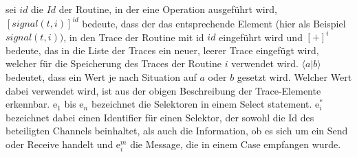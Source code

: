 sei $id$ die $Id$ der Routine, in der eine Operation ausgeführt wird,
$[signal(t, i)]^{id}$ bedeute, dass der das entsprechende Element (hier als 
Beispiel $signal(t, i))$, in den Trace der Routine mit id $id$ eingeführt wird
und $[+]^i$ bedeute, das in die Liste der Traces ein neuer, leerer Trace 
eingefügt wird, welcher für die Speicherung des Traces der Routine $i$ 
verwendet wird. 
$\langle a|b\rangle$ bedeutet, dass ein Wert je nach Situation auf $a$ oder $b$ gesetzt 
wird. Welcher Wert dabei verwendet wird, ist aus der obigen Beschreibung der 
Trace-Elemente erkennbar. $\text{e}_1$ bis $\text{e}_n$ bezeichnet die Selektoren in einem Select statement.
$\text{e}_i^*$ bezeichnet dabei einen Identifier für einen Selektor, der sowohl die 
Id des beteiligten Channels beinhaltet, als auch die Information, ob es sich um ein 
Send oder Receive handelt und $\text{e}_i^m$ die Message, die in einem Case 
empfangen wurde. 
